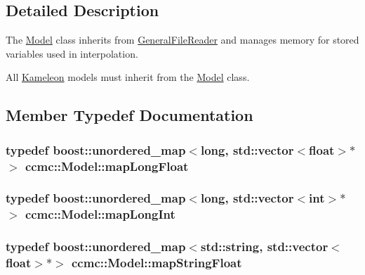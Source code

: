 \subsection{Detailed Description}
The \hyperlink{classccmc_1_1_model}{Model} class inherits from \hyperlink{classccmc_1_1_general_file_reader}{General\-File\-Reader} and manages memory for stored variables used in interpolation. 

All \hyperlink{classccmc_1_1_kameleon}{Kameleon} models must inherit from the \hyperlink{classccmc_1_1_model}{Model} class. 

\subsection{Member Typedef Documentation}
\hypertarget{classccmc_1_1_model_ad5da02fd8e4dcfbd4c0425ae6cfdc829}{
\subsubsection[{map\-Long\-Float}]{\setlength{\rightskip}{0pt plus 5cm}typedef boost\-::unordered\-\_\-map$<$long, std\-::vector$<$float$>$$\ast$$>$ {\bf ccmc\-::\-Model\-::map\-Long\-Float}\hspace{0.3cm}{\ttfamily [protected]}}}\label{classccmc_1_1_model_ad5da02fd8e4dcfbd4c0425ae6cfdc829}
\hypertarget{classccmc_1_1_model_aacb96d67a660454a3287439db8b474a7}{
\subsubsection[{map\-Long\-Int}]{\setlength{\rightskip}{0pt plus 5cm}typedef boost\-::unordered\-\_\-map$<$long, std\-::vector$<$int$>$$\ast$$>$ {\bf ccmc\-::\-Model\-::map\-Long\-Int}\hspace{0.3cm}{\ttfamily [protected]}}}\label{classccmc_1_1_model_aacb96d67a660454a3287439db8b474a7}
\hypertarget{classccmc_1_1_model_a0569e60cc0eab011a5ec40f927e1c307}{
\subsubsection[{map\-String\-Float}]{\setlength{\rightskip}{0pt plus 5cm}typedef boost\-::unordered\-\_\-map$<$std\-::string, std\-::vector$<$float$>$$\ast$$>$ {\bf ccmc\-::\-Model\-::map\-String\-Float}\hspace{0.3cm}{\ttfamily [protected]}}}\label{classccmc_1_1_model_a0569e60cc0eab011a5ec40f927e1c307}
